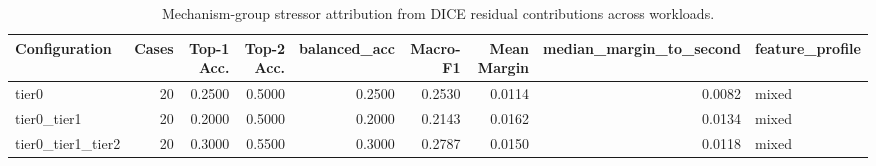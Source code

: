 \begin{table}[t]
\centering
\caption{Mechanism-group stressor attribution from DICE residual contributions across workloads.}
\label{tab:dice_stressor_diagnosis}
\footnotesize
\begin{tabular}{lrrrrrrrl}
\toprule
Configuration & Cases & Top-1 Acc. & Top-2 Acc. & balanced_acc & Macro-F1 & Mean Margin & median_margin_to_second & feature_profile \\
\midrule
tier0 & 20 & 0.2500 & 0.5000 & 0.2500 & 0.2530 & 0.0114 & 0.0082 & mixed \\
tier0_tier1 & 20 & 0.2000 & 0.5000 & 0.2000 & 0.2143 & 0.0162 & 0.0134 & mixed \\
tier0_tier1_tier2 & 20 & 0.3000 & 0.5500 & 0.3000 & 0.2787 & 0.0150 & 0.0118 & mixed \\
\bottomrule
\end{tabular}

\end{table}
